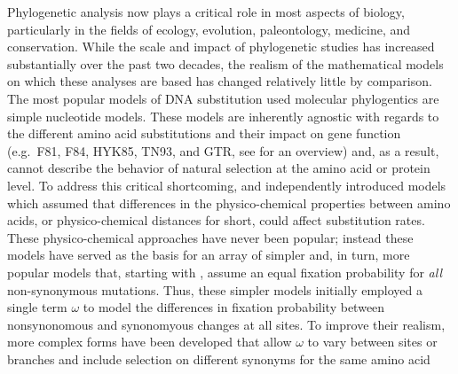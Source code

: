 \documentclass[12pt,letterpaper]{article}
\renewcommand{\subsection}[1]{%
\bigskip
\begin{center}
\begin{large}
\normalfont\itshape #1
\end{large}
\end{center}}
\newcommand{\PC}{physico-chemical\xspace}
\begin{document}
Phylogenetic analysis now plays a critical role in most aspects of biology, particularly in the fields of ecology, evolution, paleontology, medicine, and conservation.
While the scale and impact of phylogenetic studies has increased substantially over the past two decades, the realism of the mathematical models on which these analyses are based has changed relatively little by comparison.
The most popular models of DNA substitution used molecular phylogentics are simple nucleotide models.
These models are inherently agnostic with regards to the different amino acid substitutions and their impact on gene function (e.g.~F81, F84, HYK85, TN93, and GTR, see \citet{Yang2014} for an overview) and, as a result, cannot describe the behavior of natural selection at the amino acid or protein level.
To address this critical shortcoming, \citet{GoldmanAndYang1994} and \citet{MuseAndGaut1994} independently introduced models which assumed that differences in the \PC properties between amino acids, or \PC distances for short, could affect substitution rates. 
These \PC approaches have never been popular; instead these models have served as the basis for an array of simpler and, in turn, more popular models that, starting with  \citep{YangAndNielsen1998,NielsenAndYang1998},  assume an equal fixation probability for \emph{all} non-synonymous mutations.
Thus, these simpler models initially employed a single term $\omega$ to model the differences in fixation probability between nonsynonomous and synonomyous changes at all sites.
To improve their realism, more complex forms have been developed that allow $\omega$ to vary between sites or branches \citep[as cited in ][]{Anisimova2012} and include selection on different synonyms for the same amino acid \cite[e.g.][]{YangAndNielsen2008} %
\end{document}
